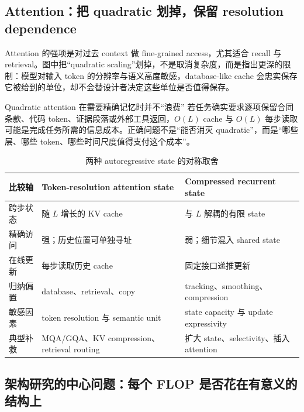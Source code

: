 \subsection{Attention：把 quadratic 划掉，保留 resolution dependence}

Attention 的强项是对过去 context 做 fine-grained access，尤其适合 recall 与 retrieval。图中把“quadratic scaling”划掉，不是取消复杂度，而是指出更深的限制：模型对输入 token 的分辨率与语义高度敏感，database-like cache 会忠实保存它被给到的单位，却不会替设计者决定这些单位是否值得保存。


\begin{warningbox}{Quadratic attention 在需要精确记忆时并不“浪费”}
若任务确实要求逐项保留合同条款、代码 token、证据段落或外部工具返回，$O(L)$ cache 与 $O(L)$ 每步读取可能是完成任务所需的信息成本。正确问题不是“能否消灭 quadratic”，而是“哪些层、哪些 token、哪些时间尺度值得支付这个成本”。
\end{warningbox}

\begin{table}[H]
\centering
\caption{两种 autoregressive state 的对称取舍}
\begin{tabularx}{\textwidth}{L{0.18\textwidth}>{\raggedright\arraybackslash}X >{\raggedright\arraybackslash}X}
\toprule
比较轴 & Token-resolution attention state & Compressed recurrent state \\
\midrule
跨步状态 & 随 $L$ 增长的 KV cache & 与 $L$ 解耦的有限 state \\
精确访问 & 强；历史位置可单独寻址 & 弱；细节混入 shared state \\
在线更新 & 每步读取历史 cache & 固定接口递推更新 \\
归纳偏置 & database、retrieval、copy & tracking、smoothing、compression \\
敏感因素 & token resolution 与 semantic unit & state capacity 与 update expressivity \\
典型补救 & MQA/GQA、KV compression、retrieval routing & 扩大 state、selectivity、插入 attention \\
\bottomrule
\end{tabularx}
\end{table}

\subsection{架构研究的中心问题：每个 FLOP 是否花在有意义的结构上}


